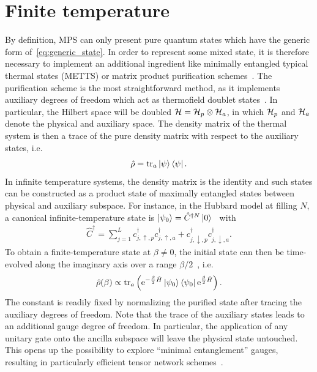 \section{Finite temperature}
\label{sec:finite_temperature}
%
%
By definition, MPS can only present pure quantum states which have the generic form of~\cref{eq:generic_state}.
In order to represent some mixed state, it is therefore necessary to implement an additional ingredient like minimally entangled typical thermal states (METTS) or matrix product purification schemes~\cite{Binder2015}.
The purification scheme is the most straightforward method, as it implements auxiliary degrees of freedom which act as thermofield doublet states~\cite{Barnett1987}.
In particular, the Hilbert space will be doubled $\mathcal{H} = \mathcal{H}_p\otimes\mathcal{H}_a$, in which $\mathcal{H}_p$ and $\mathcal{H}_a$ denote the physical and auxiliary space.
The density matrix of the thermal system is then a trace of the pure density matrix with respect to the auxiliary states, i.e.
\begin{align}
    \hat\rho = {\rm tr}_a\ket\psi\bra\psi.
\end{align}
In infinite temperature systems, the density matrix is the identity and such states can be constructed as a product state of maximally entangled states between physical and auxiliary subspace.
For instance, in the Hubbard model at filling $N$, a canonical infinite-temperature state is $\ket{\psi_0}=\hat C^{\dag N}\ket0$~\cite{Barthel2016} with
\begin{align}
    \hat C^\dag = \sum_{j=1}^L c^\dag_{j,\uparrow,p}c^\dag_{j,\uparrow,a} + c^\dag_{j,\downarrow,p}c^\dag_{j,\downarrow,a}.
\end{align}
To obtain a finite-temperature state at $\beta\neq0$, the initial state can then be time-evolved along the imaginary axis over a range $\beta/2$~\cite{Barnett1987}, i.e.
\begin{align}
    \hat\rho(\beta) \propto {\rm tr}_a\left( \mathrm e^{-\frac\beta2\hat H}\ket{\psi_0}\bra{\psi_0}\mathrm e^{\frac\beta2\hat H} \right).
\end{align}
The constant is readily fixed by normalizing the purified state after tracing the auxiliary degrees of freedom.
Note that the trace of the auxiliary states leads to an additional gauge degree of freedom.
In particular, the application of any unitary gate onto the ancilla subspace will leave the physical state untouched.
This opens up the possibility to explore ``minimal entanglement'' gauges, resulting in particularly efficient tensor network schemes~\cite{Barthel2013,Hauschild2018}.
%
%
